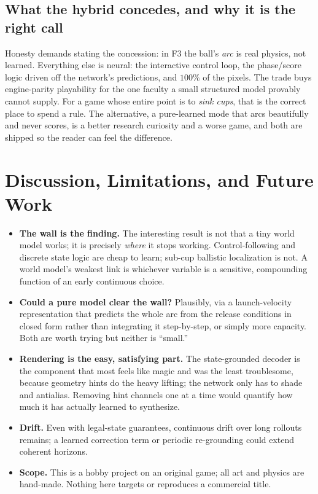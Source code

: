 \documentclass[11pt]{article}
\begin{document}
\subsection{What the hybrid concedes, and why it is the right call}

Honesty demands stating the concession: in F3 the ball's \emph{arc} is real physics, not learned. Everything else is neural: the interactive control loop, the phase/score logic driven off the network's predictions, and $100\%$ of the pixels. The trade buys engine-parity playability for the one faculty a small structured model provably cannot supply. For a game whose entire point is to \emph{sink cups}, that is the correct place to spend a rule. The alternative, a pure-learned mode that arcs beautifully and never scores, is a better research curiosity and a worse game, and both are shipped so the reader can feel the difference.

\section{Discussion, Limitations, and Future Work}

\begin{itemize}
    \item \textbf{The wall is the finding.} The interesting result is not that a tiny world model works; it is precisely \emph{where} it stops working. Control-following and discrete state logic are cheap to learn; sub-cup ballistic localization is not. A world model's weakest link is whichever variable is a sensitive, compounding function of an early continuous choice.
    \item \textbf{Could a pure model clear the wall?} Plausibly, via a launch-velocity representation that predicts the whole arc from the release conditions in closed form rather than integrating it step-by-step, or simply more capacity. Both are worth trying but neither is ``small.''
    \item \textbf{Rendering is the easy, satisfying part.} The state-grounded decoder is the component that most feels like magic and was the least troublesome, because geometry hints do the heavy lifting; the network only has to shade and antialias. Removing hint channels one at a time would quantify how much it has actually learned to synthesize.
    \item \textbf{Drift.} Even with legal-state guarantees, continuous drift over long rollouts remains; a learned correction term or periodic re-grounding could extend coherent horizons.
    \item \textbf{Scope.} This is a hobby project on an original game; all art and physics are hand-made. Nothing here targets or reproduces a commercial title.
\end{itemize}
\end{document}
